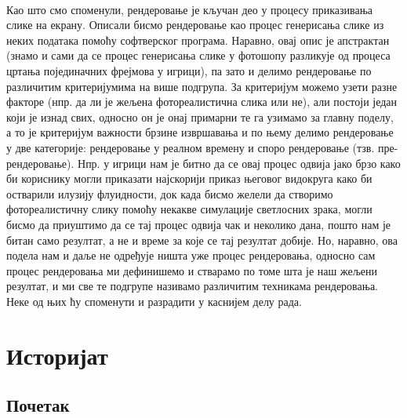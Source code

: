 \documentclass[12pt]{article}
\begin{document}
	\paragraph{}
	Као што смо споменули, рендеровање је кључан део у процесу приказивања слике на екрану. Описали бисмо рендеровање као процес генерисања слике из неких података помоћу софтверског програма. Наравно, овај опис је апстрактан (знамо и сами да се процес генерисања слике у фотошопу разликује од процеса цртања појединачних фрејмова у игрици), па зато и делимо рендеровање по различитим критеријумима на више подгрупа. За критеријум можемо узети разне факторе (нпр. да ли је жељена фотореалистична слика или не), али постоји један који је изнад свих, односно он је онај примарни те га узимамо за главну поделу, а то је критеријум важности брзине извршавања и по њему делимо рендеровање у две категорије: рендеровање у реалном времену и споро рендеровање (тзв. пре-рендеровање). Нпр. у игрици нам је битно да се овај процес одвија јако брзо како би кориснику могли приказати најскорији приказ његовог видокруга како би остварили илузију флуидности, док када бисмо желели да створимо фотореалистичну слику помоћу некакве симулације светлосних зрака, могли бисмо да приуштимо да се тај процес одвија чак и неколико дана, пошто нам је битан само резултат, а не и време за које се тај резултат добије. Но, наравно, ова подела нам и даље не одређује ништа уже процес рендеровања, односно сам процес рендеровања ми дефинишемо и стварамо по томе шта је наш жељени резултат, и ми све те подгрупе називамо различитим техникама рендеровања. Неке од њих ћу споменути и разрадити у каснијем делу рада.
	
	\section{Историјат}
	
	\subsection{Почетак}
\end{document}
